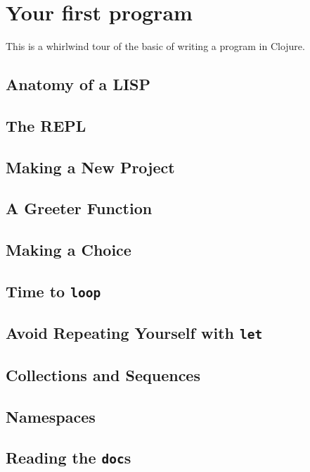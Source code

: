 \chapter{Your first program}

This is a whirlwind tour of the basic of writing a program in Clojure.

\section{Anatomy of a LISP}

\section{The REPL}

\section{Making a New Project}

\section{A Greeter Function}

\section{Making a Choice}

\section{Time to {\tt loop}}

\section{Avoid Repeating Yourself with {\tt let}}

\section{Collections and Sequences}

\section{Namespaces}

\section{Reading the {\tt doc}s}
